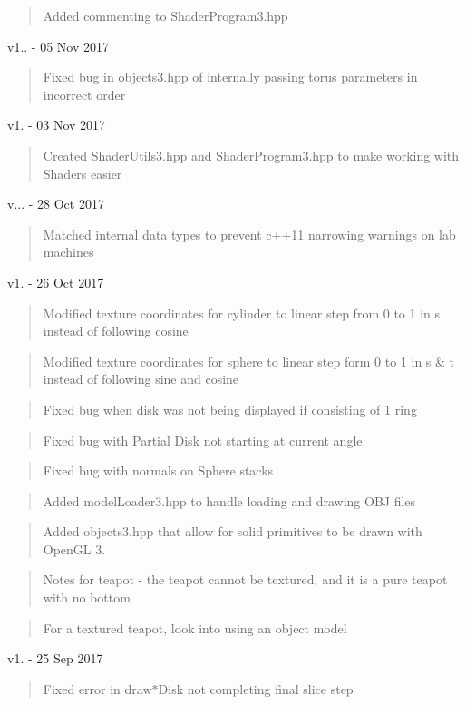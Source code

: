 \begin{quote}
Added commenting to Shader\+Program3.\+hpp \end{quote}
v1.. -\/ 05 Nov 2017 \begin{quote}
Fixed bug in objects3.\+hpp of internally passing torus parameters in incorrect order \end{quote}
v1. -\/ 03 Nov 2017 \begin{quote}
Created Shader\+Utils3.\+hpp and Shader\+Program3.\+hpp to make working with Shaders easier \end{quote}
v... -\/ 28 Oct 2017 \begin{quote}
Matched internal data types to prevent c++11 narrowing warnings on lab machines \end{quote}
v1. -\/ 26 Oct 2017 \begin{quote}
Modified texture coordinates for cylinder to linear step from 0 to 1 in s instead of following cosine \end{quote}
\begin{quote}
Modified texture coordinates for sphere to linear step form 0 to 1 in s \& t instead of following sine and cosine \end{quote}
\begin{quote}
Fixed bug when disk was not being displayed if consisting of 1 ring \end{quote}
\begin{quote}
Fixed bug with Partial Disk not starting at current angle \end{quote}
\begin{quote}
Fixed bug with normals on Sphere stacks \end{quote}
\begin{quote}
Added model\+Loader3.\+hpp to handle loading and drawing OBJ files \end{quote}
\begin{quote}
Added objects3.\+hpp that allow for solid primitives to be drawn with Open\+GL 3. \end{quote}
\begin{quote}
Notes for teapot -\/ the teapot cannot be textured, and it is a pure teapot with no bottom \end{quote}
\begin{quote}
For a textured teapot, look into using an object model \end{quote}
v1. -\/ 25 Sep 2017 \begin{quote}
Fixed error in draw$\ast$\+Disk not completing final slice step \end{quote}
